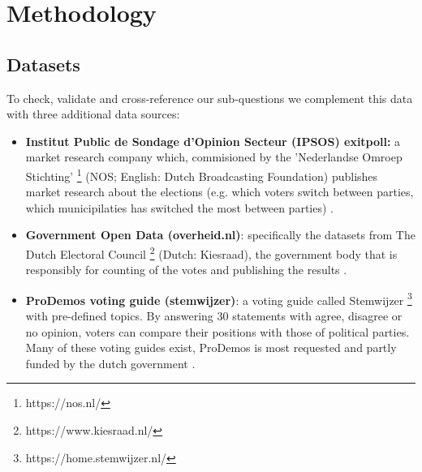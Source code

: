\section{Methodology}

\subsection{Datasets}

To check, validate and cross-reference our sub-questions we complement this data with three additional data sources: 

\begin{itemize}
  \item \textbf{Institut Public de Sondage d'Opinion Secteur (IPSOS) exitpoll:} a market research company which, commisioned by the 'Nederlandse Omroep Stichting' \footnote{https://nos.nl/} (NOS; English: Dutch Broadcasting Foundation) publishes market research about the elections (e.g. which voters switch between parties, which municipilaties has switched the most between parties) \cite{nos}.
  \item \textbf{Government Open Data (overheid.nl)}: specifically the datasets from The Dutch Electoral Council \footnote{https://www.kiesraad.nl/} (Dutch: Kiesraad), the government body that is responsibly for counting of the votes and publishing the results \cite{kiesraad}.
  \item \textbf{ProDemos voting guide (stemwijzer)}: a voting guide called Stemwijzer \footnote{https://home.stemwijzer.nl/} with pre-defined topics. By answering 30 statements with agree, disagree or no opinion, voters can compare their positions with those of political parties. Many of these voting guides exist, ProDemos is most requested and partly funded by the dutch government \cite{prodemos}.
\end{itemize}